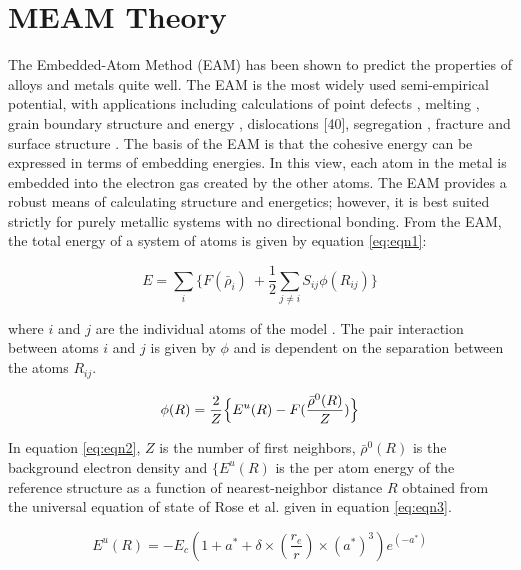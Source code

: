 \documentclass[review]{elsarticle}
\begin{document}
 
\section{MEAM Theory}
The Embedded-Atom Method (EAM) \cite{daw1984, daw1993, daw1983} has been shown to predict the properties of alloys and metals quite well. The EAM is the most widely used semi-empirical potential, with applications including calculations of point defects \cite{olsson2009}, melting \cite{belaschenko2011}, grain boundary structure and energy \cite{liu1999}, dislocations \cite{chassange2011} [40], segregation \cite{li2009MatChem}, fracture \cite{vatne2011} and surface structure \cite{rose1984}.  The basis of the EAM is that the cohesive energy can be expressed in terms of embedding energies.  In this view, each atom in the metal is embedded into the electron gas created by the other atoms.  The EAM provides a robust means of calculating structure and energetics; however, it is best suited strictly for purely metallic systems with no directional bonding.
From the EAM, the total energy of a system of atoms is given by equation \ref{eq:eqn1}:


\begin{equation}
\label{eq:eqn1}
E = \sum_{i} \{F(\bar{\rho}_{i})\ +  \frac{1}{2} \sum_{j \neq i} S_{ij}\phi(R_{ij})   \}
\end{equation}

where $i$ and $j$ are the individual atoms of the model \cite{daw1983, daw1984}.  The pair interaction between atoms $i$ and $j$ is given by $\phi$ \cite{baskes1992} and is dependent on the separation between the atoms $R_{ij}$.

\begin{equation}
\label{eq:eqn2}
\phi(R) = \frac{2}{Z} \Bigl\{ E^{u}(R) - F( \frac{ \bar{ \rho}^{0}(R)}{Z}) \Bigr\}  
\end{equation}

In equation \ref{eq:eqn2}, $Z$ is the number of first neighbors, $\bar{ \rho}^{0}(R)$ is the background electron density and $\{E^{u}(R)$ is the per atom energy of the reference structure as a function of nearest-neighbor distance $R$ \cite{baskes2000} obtained from the universal equation of state of Rose et al. \cite{rose1984} given in equation \ref{eq:eqn3}.

\begin{equation}
\label{eq:eqn3}
 E^{u}(R) = -E_{c} (1 + a^{*} + \delta \times (\frac{r_{e}}{r}) \times (a^{*})^{3}) e^{(-a^{*})}
 \end{equation}
\end{document}
